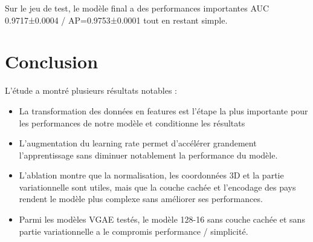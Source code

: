 \documentclass[french]{llncs}
\begin{document}
Sur le jeu de test, le modèle final a des performances importantes AUC 0.9717±0.0004 / AP=0.9753±0.0001 tout en restant simple.




 
 
 \section{Conclusion }
L'étude a montré plusieurs résultats notables : 

\begin{itemize}
    \item La transformation des données en features est l'étape la plus importante pour les performances de notre modèle et conditionne les résultats
    \item L'augmentation du learning rate permet d'accélérer grandement l'apprentissage sans diminuer notablement la performance du modèle.
    \item L'ablation montre que la normalisation, les coordonnées 3D et la partie variationnelle sont utiles, mais que la couche cachée et l'encodage des pays rendent le modèle plus complexe sans améliorer ses performances.
    \item Parmi les modèles VGAE testés, le modèle 128-16 sans couche cachée et sans partie variationnelle a le compromis performance / simplicité.
  
\end{itemize}
 
  
   


 
     

   \newpage
     
            
\end{document}
